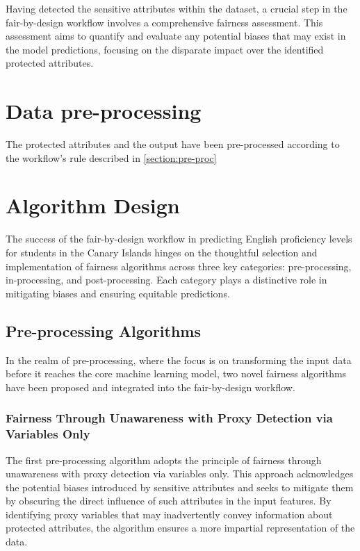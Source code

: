 \documentclass[12pt,a4paper,openright,twoside]{book}
\begin{document}
Having detected the sensitive attributes within the dataset, a crucial step in the fair-by-design workflow involves a comprehensive fairness assessment. This assessment aims to quantify and evaluate any potential biases that may exist in the model predictions, focusing on the disparate impact over the identified protected attributes.

\section{Data pre-processing}

The protected attributes and the output have been pre-processed according to the workflow's rule described in \cref{section:pre-proc}

\section{Algorithm Design}

The success of the fair-by-design workflow in predicting English proficiency levels for students in the Canary Islands hinges on the thoughtful selection and implementation of fairness algorithms across three key categories: pre-processing, in-processing, and post-processing. Each category plays a distinctive role in mitigating biases and ensuring equitable predictions.

\subsection{Pre-processing Algorithms}

In the realm of pre-processing, where the focus is on transforming the input data before it reaches the core machine learning model, two novel fairness algorithms have been proposed and integrated into the fair-by-design workflow.

\subsubsection{Fairness Through Unawareness with Proxy Detection via Variables Only}

The first pre-processing algorithm adopts the principle of fairness through unawareness with proxy detection via variables only. This approach acknowledges the potential biases introduced by sensitive attributes and seeks to mitigate them by obscuring the direct influence of such attributes in the input features. By identifying proxy variables that may inadvertently convey information about protected attributes, the algorithm ensures a more impartial representation of the data.
\end{document}
